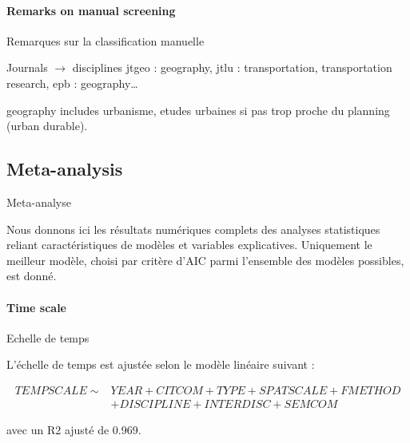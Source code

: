 \paragraph{Remarks on manual screening}{Remarques sur la classification manuelle}

Journals $\rightarrow$ disciplines
jtgeo : geography, jtlu : transportation, transportation research, epb : geography\ldots

geography includes urbanisme, etudes urbaines si pas trop proche du planning (urban durable).







\subsection{Meta-analysis}{Meta-analyse}

Nous donnons ici les résultats numériques complets des analyses statistiques reliant caractéristiques de modèles et variables explicatives. Uniquement le meilleur modèle, choisi par critère d'AIC parmi l'ensemble des modèles possibles, est donné.

\paragraph{Time scale}{Echelle de temps}

L'échelle de temps est ajustée selon le modèle linéaire suivant :

\[
\begin{split}
	TEMPSCALE \sim & YEAR+CITCOM+TYPE+SPATSCALE+FMETHOD\\
	& +DISCIPLINE+INTERDISC+SEMCOM
\end{split}
\]


avec un R2 ajusté de 0.969.



